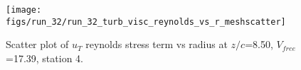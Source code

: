 \begin{figure}[H]
\centering
\texttt{[image: figs/run\_32/run\_32\_turb\_visc\_reynolds\_vs\_r\_meshscatter]}
\caption{Scatter plot of $
u_T$ reynolds stress term vs radius at $z/c$=8.50, $V_{free}$=17.39, station 4.}
\label{fig:run_32_turb_visc_reynolds_vs_r_meshscatter}
\end{figure}


